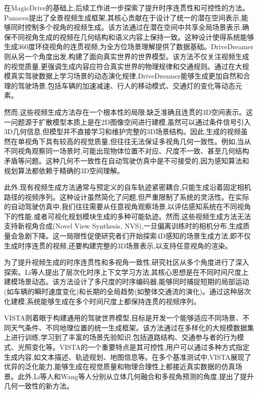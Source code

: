 在MagicDrive的基础上,后续工作进一步探索了提升时序连贯性和可控性的方法。Panacea\cite{wen2024panacea}提出了全景视频生成框架,其核心贡献在于设计了统一的潜在空间表示,能够同时控制多个视角的视频生成。该方法通过在潜在空间中共享全局场景表示,确保不同视角生成的视频在几何结构和语义内容上保持一致。这种设计使得系统能够生成360度环绕视角的连贯视频,为全方位场景理解提供了数据基础。DriveDreamer\cite{wang2024drivedreamer}则从另一个角度出发,构建了面向真实世界的世界模型。该方法不仅关注视频生成的视觉质量,更强调生成内容应符合真实世界的物理规律和交通规则。通过在大规模真实驾驶数据上学习场景的动态演化规律,DriveDreamer能够生成更加自然和合理的驾驶场景,包括车辆的加速减速、行人的移动模式、交通灯的变化等动态元素。

然而,这些视频生成方法存在一个根本性的局限:缺乏准确且连贯的3D空间表示。这一问题源于扩散模型本质上是在2D图像空间进行建模,虽然可以通过条件信号引入3D几何信息,但模型并不直接学习和维护完整的3D场景结构。因此,生成的视频虽然在单视角下具有较高的视觉质量,但往往无法保证多视角几何一致性。例如,当从不同视角观察同一场景时,可能出现物体位置不对应、尺度不一致、甚至几何结构矛盾等问题。这种几何不一致性在自动驾驶仿真中是不可接受的,因为感知算法和规划算法都依赖于精确的3D空间理解。

此外,现有视频生成方法通常与预定义的自车轨迹紧密耦合,只能生成沿着固定相机路径的视频序列。这种设计虽然简化了问题,但严重限制了系统的灵活性。在实际的自动驾驶仿真中,我们往往需要从任意视角观察场景,以评估感知系统在不同视角下的性能,或者可视化规划模块生成的多种可能轨迹。然而,这些视频生成方法无法支持新视角合成(Novel View Synthesis, NVS),一旦偏离训练时的相机分布,生成质量会急剧下降。这一局限性促使研究者们开始探索4D感知的场景生成方法,即不仅生成时序连贯的视频,还要构建完整的3D场景表示,以支持任意视角的渲染。

为了提升视频生成的时序连贯性和多视角一致性,研究社区从多个角度进行了深入探索\cite{li2024hierarchical,gao2025vista,li2023bridging,wang2024driving}。Li等人\cite{li2024hierarchical}提出了层次化时序上下文学习方法,其核心思想是在不同时间尺度上建模场景动态。该方法设计了多尺度的时序编码器,能够同时捕捉短期的局部运动(如车辆的瞬时速度变化)和长期的全局趋势(如整体交通流的演化)。通过这种层次化建模,系统能够生成在多个时间尺度上都保持连贯的视频序列。

VISTA\cite{gao2025vista}则着眼于构建通用的驾驶世界模型,目标是开发一个能够适应不同场景、不同天气条件、不同地理位置的统一生成框架。该方法通过在多样化的大规模数据集上进行训练,学习到了丰富的场景先验知识,包括道路结构、交通参与者的行为模式、光照变化等。VISTA的一个重要特点是其可控性,用户可以通过多种方式指定生成内容,如文本描述、轨迹规划、地图信息等。在多个基准测试中,VISTA展现了优异的泛化能力,能够生成在视觉质量和物理合理性上都接近真实数据的仿真场景。此外,Li等人\cite{li2023bridging}和Wang等人\cite{wang2024driving}分别从立体几何融合和多视角预测的角度,提出了提升几何一致性的新方法。

